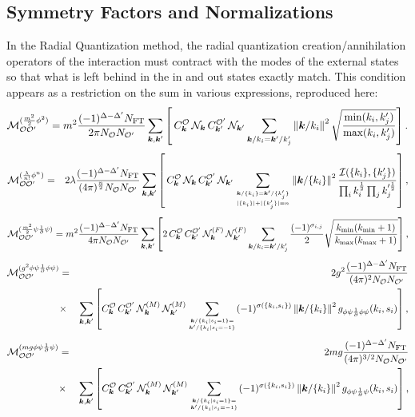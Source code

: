 \documentclass[12pt]{article}
\newcommand{\be}{\begin{eqnarray}}
\newcommand{\ee}{\end{eqnarray}}
\newcommand{\Mcal}{{\mathcal M}}
\newcommand{\Ncal}{{\mathcal N}}
\newcommand{\Ocal}{{\mathcal O}}
\newcommand{\cO}{{\mathcal O}}
\newcommand{\CI}{{\cal I}}
\newcommand{\CO}{{\cal O}}
\newcommand{\nn}{\nonumber}
\newcommand{\p}{\partial}
\newcommand{\bk}{\boldsymbol{k}}
\newcommand{\norm}[1]{\left\lVert#1\right\rVert}
\begin{document}
\subsection{Symmetry Factors and  Normalizations}


In the Radial Quantization method, the radial quantization creation/annihilation operators of the interaction must contract with the modes of the external states so that what is left behind in the in and out states exactly match. This condition appears as a restriction on the sum in various expressions, reproduced here:
\begin{equation}
\Mcal_{\cO \cO^\prime}^{(\frac{m^2}{2} \phi^2)} =m^2 \frac{(-1)^{\Delta-\Delta'}N_{\rm FT}}{2\pi N_{\cO}N_{\cO^\prime}} \sum_{\bk, \bk'} \left[   \, C^\Ocal_{\bk} \, \Ncal_{\bk}\, C^{\Ocal'}_{\bk^\prime} \,  \Ncal_{\bk'}  \sum_{\bk/k_i = \bk'/k'_j} \norm{\bk/k_i}^2  \sqrt{\frac{{\rm min}(k_i,k'_j)}{{\rm max}(k_i,k'_j)}} \right]. 
\label{eq:II:ScalarPhi2Final}
\end{equation}
\be
\Mcal_{\cO \cO^\prime}^{(\frac{\lambda}{n!}\phi^n)} &=&2 \lambda  \frac{(-1)^{\Delta-\Delta'}N_{\rm FT}  }{(4\pi)^{\frac{n}{2}}N_{\cO}N_{\cO^\prime}}  \sum_{\bk, \bk'} \left[   \, C^\Ocal_{\bk} \, \Ncal_{\bk}\, C^{\Ocal'}_{\bk^\prime} \,  \Ncal_{\bk'}  \sum_{\bk/\{k_i\} = \bk'/\{k_j'\} \atop |\{k_i\}| + |\{k_j'\}| = n} 
\norm{\bk/\{k_i\}}^2 \frac{\CI(\{k_i\}, \{k_j'\})  }{\prod_i k_i^{\frac{1}{2}} \prod_j k_j'^{\frac{1}{2}}} \right], \nn\\
\label{eq:II:ScalarPhiNFinal}
\ee
\begin{equation}
\Mcal_{\cO \cO^\prime}^{(\frac{m^2}{2}\psi \frac{1}{\partial} \psi)} = m^2 \frac{(-1)^{\Delta-\Delta'}N_{\rm FT}}{4\pi N_\CO N_{\CO'}} \sum_{\bk, \bk'} \left[  2 \, C^\Ocal_{\bk} \, C^{\Ocal'}_{\bk^\prime} \, \Ncal^{(F)}_{\bk}\, \Ncal^{(F)}_{\bk'}  \sum_{\bk/k_i = \bk'/k'_j}\frac{(-1)^{\sigma_{i,j}} }{2} \sqrt{ \frac{k_{\rm min}(k_{\rm min}+1)}{k_{\rm max}(k_{\rm max}+1)}} \right], 
\end{equation}
\be
\Mcal_{\cO \cO^\prime}^{(g^2 \phi \psi \frac{1}{\partial} \phi \psi)} &=& 2g^2 \frac{(-1)^{\Delta-\Delta'}N_{\rm FT}}{(4\pi)^2 N_\CO N_{\CO'}} \nn\\ &\times&  \sum_{\bk, \bk'} \left[   C^{\cO}_{\bk} \, C^{\cO'}_{\bk^\prime} \, \Ncal^{(M)}_{\bk}\, \Ncal^{(M)}_{\bk'}  \sum_{\bk/\{k_i| s_i=1\} = \atop  \bk'/\{k_i | s_i =-1 \}}(-1)^{\sigma(\{k_i, s_i\}) } \norm{\bk/\{k_i\}}^2g_{\phi\psi\frac{1}{\p}\phi\psi}(k_i, s_i) \right],  \nn\\
\label{eq:yukawaquarticRQ}
\ee
\be
\Mcal_{\cO \cO^\prime}^{(m g\phi \psi \frac{1}{\partial} \psi)} &=&  2mg \frac{(-1)^{\Delta-\Delta'}N_{\rm FT}}{(4\pi)^{3/2}N_{\CO} N_{\CO'}} \nn\\
 & \times & \sum_{\bk, \bk'} \left[  C^{\cO}_{\bk} \, C^{\cO'}_{\bk^\prime} \, \Ncal^{(M)}_{\bk}\, \Ncal^{(M)}_{\bk'}  \sum_{\bk/\{k_i| s_i=1\} = \atop  \bk'/\{k_i | s_i =-1 \}}(-1)^{\sigma(\{k_i, s_i\}) }  \norm{\bk/\{k_i\}}^2 g_{\phi\psi\frac{1}{\p}\psi}(k_i, s_i) \right],  \nn\\
\ee
\end{document}
